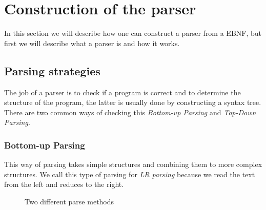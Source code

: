 
\section{Construction of the parser}
	In this section we will describe how one can construct a parser from a EBNF, but first we will describe what a parser is and how it works.
	
	\subsection{Parsing strategies}
		The job of a parser is to check if a program is correct and 
		to determine the structure of the program, the latter is usually done by constructing a syntax tree.
		There are two common ways of checking this {\it Bottom-up Parsing} and {\it Top-Down Parsing}.
		
		\subsubsection*{Bottom-up Parsing}
			This way of parsing takes simple structures and combining them to more complex structures.
			We call this type of parsing for {\it LR parsing} because we read the text from the left and reduces to the right.
			\begin{figure}[H]
				\centering
				\caption{Two different parse methods}\label{fig:parsers}
			\end{figure}
			
